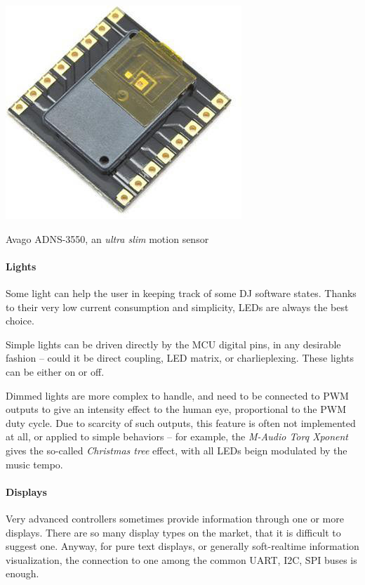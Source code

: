 \documentclass[a4paper,10pt]{article}
\makeatletter
\newenvironment{figurehere}{\def\@captype{figure}\vspace{2ex}}{\vspace{2ex}}
\makeatother
\begin{document}
\begin{multicols}{2}
\begin{figurehere}
	\centering
	\includegraphics[keepaspectratio=true,width=0.5\columnwidth]{images/avago_adns3550.jpg}
	\caption{Avago ADNS-3550, an \emph{ultra slim} motion sensor}
	\label{fig:avago_adns3550}
\end{figurehere}


\paragraph{Lights}
Some light can help the user in keeping track of some DJ software states.
Thanks to their very low current consumption and simplicity, LEDs are
always the best choice.

Simple lights can be driven directly by the MCU digital pins, in
any desirable fashion -- could it be direct coupling, LED matrix,
or charlieplexing. These lights can be either on or off.

Dimmed lights are more complex to handle, and need to be connected to PWM
outputs to give an intensity effect to the human eye, proportional to the
PWM duty cycle. Due to scarcity of such outputs, this feature is often not
implemented at all, or applied to simple behaviors -- for example, the
\emph{M-Audio Torq Xponent} \cite{maudio_xponent} gives the so-called
\emph{Christmas tree} effect, with all LEDs beign modulated by the music tempo.


\paragraph{Displays}
Very advanced controllers sometimes provide information through one or more
displays. There are so many display types on the market, that it is difficult
to suggest one. Anyway, for pure text displays, or generally soft-realtime
information visualization, the connection to one among the common UART, I2C,
SPI buses is enough.



\end{multicols}
\end{document}
